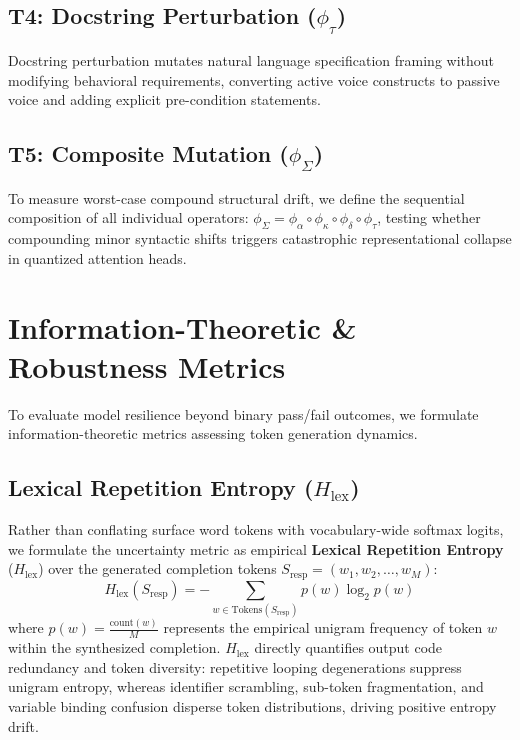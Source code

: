 \documentclass[11pt,twocolumn]{article}
\begin{document}
\subsection{T4: Docstring Perturbation (\texorpdfstring{$\phi_\tau$}{phi-tau})}
Docstring perturbation mutates natural language specification framing without modifying behavioral requirements, converting active voice constructs to passive voice and adding explicit pre-condition statements.

\subsection{T5: Composite Mutation (\texorpdfstring{$\phi_\Sigma$}{phi-Sigma})}
To measure worst-case compound structural drift, we define the sequential composition of all individual operators: $\phi_\Sigma = \phi_\alpha \circ \phi_\kappa \circ \phi_\delta \circ \phi_\tau$, testing whether compounding minor syntactic shifts triggers catastrophic representational collapse in quantized attention heads.

\section{Information-Theoretic \& Robustness Metrics}
\label{sec:metrics}

To evaluate model resilience beyond binary pass/fail outcomes, we formulate information-theoretic metrics assessing token generation dynamics.

\subsection{Lexical Repetition Entropy (\texorpdfstring{$H_{\text{lex}}$}{H_lex})}
Rather than conflating surface word tokens with vocabulary-wide softmax logits, we formulate the uncertainty metric as empirical \textbf{Lexical Repetition Entropy} ($H_{\text{lex}}$) over the generated completion tokens $S_{\text{resp}} = (w_1, w_2, \dots, w_M)$:
\begin{equation}
    H_{\text{lex}}(S_{\text{resp}}) = -\sum_{w \in \text{Tokens}(S_{\text{resp}})} p(w) \log_2 p(w)
\end{equation}
where $p(w) = \frac{\text{count}(w)}{M}$ represents the empirical unigram frequency of token $w$ within the synthesized completion. $H_{\text{lex}}$ directly quantifies output code redundancy and token diversity: repetitive looping degenerations suppress unigram entropy, whereas identifier scrambling, sub-token fragmentation, and variable binding confusion disperse token distributions, driving positive entropy drift.
\end{document}
